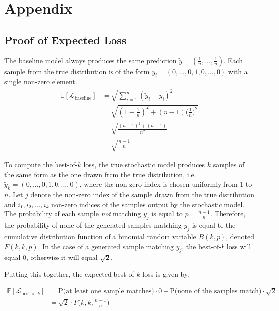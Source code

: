 \documentclass{article}
\begin{document}
\section{Appendix}







\subsection{Proof of Expected Loss}

The baseline model always produces the same prediction $\tilde{y} = (\frac{1}{n}, ..., \frac{1}{n})$. Each sample from the true distribution is of the form $y_i = (0, ..., 0, 1, 0, ..., 0)$ with a single non-zero element.
\begin{align*}
  \mathbb{E}[\mathcal{L}_{\mbox{baseline}}] &= \sqrt{\sum_{i=1}^n (\tilde{y}_i - y_i)^2} \\
  &= \sqrt{(1-\frac{1}{n})^2 + (n-1)\Big ( \frac{1}{n} \Big )^2} \\
  &= \sqrt{\frac{(n-1)^2 + (n-1)}{n^2}} \\
  &= \sqrt{\frac{n-1}{n}}
\end{align*}

To compute the best-of-$k$ loss, the true stochastic model produces $k$ samples of the same form as the one drawn from the true distribution, i.e. $\tilde{y}_k = (0, ..., 0, 1, 0, ..., 0)$, where the non-zero index is chosen uniformly from $1$ to $n$.
Let $j$ denote the non-zero index of the sample drawn from the true distribution and $i_1, i_2, ..., i_k$ non-zero indices of the samples output by the stochastic model.
The probability of each sample \textit{not} matching $y_j$ is equal to $p=\frac{n-1}{n}$.
Therefore, the probability of none of the generated samples matching $y_j$ is equal to the cumulative distribution function of a binomial random variable $B(k, p)$, denoted $F(k, k, p)$.
In the case of a generated sample matching $y_j$, the best-of-$k$ loss will equal 0, otherwise it will equal $\sqrt{2}$.

Putting this together, the expected best-of-$k$ loss is given by:

\begin{align*}
  \mathbb{E}[\mathcal{L}_{\mbox{best-of-$k$}}] &= \mbox{P(at least one sample matches)}\cdot 0 + \mbox{P(none of the samples match)} \cdot \sqrt{2} \\
  &= \sqrt{2} \cdot F\Big (k, k, \frac{n-1}{n} \Big) \\
\end{align*}
\end{document}
